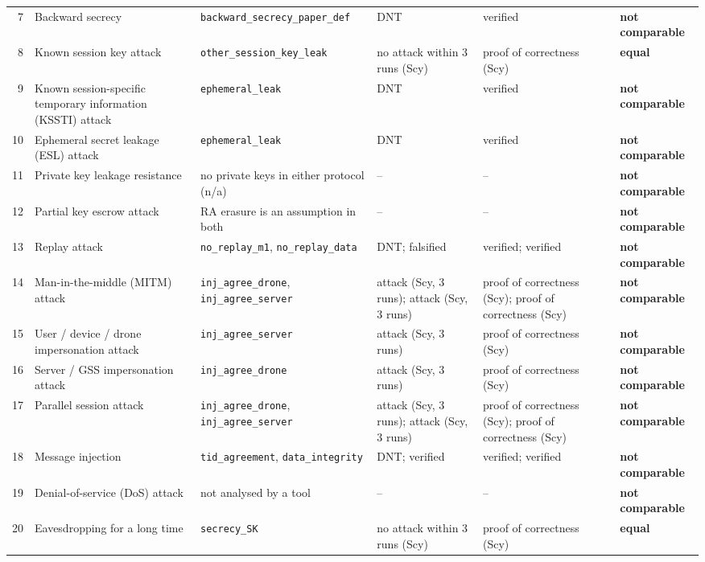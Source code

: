 \begin{table}[!t]
\begin{tabular}{rp{3.0cm}p{4.3cm}p{2.5cm}p{2.0cm}l}
7 & Backward secrecy & \texttt{backward\_\allowbreak{}secrecy\_\allowbreak{}paper\_\allowbreak{}def} & DNT & verified & \textbf{not comparable} \\
8 & Known session key attack & \texttt{other\_\allowbreak{}session\_\allowbreak{}key\_\allowbreak{}leak} & no attack within 3 runs (Scy) & proof of correctness (Scy) & \textbf{equal} \\
9 & Known session-specific temporary information (KSSTI) attack & \texttt{ephemeral\_\allowbreak{}leak} & DNT & verified & \textbf{not comparable} \\
10 & Ephemeral secret leakage (ESL) attack & \texttt{ephemeral\_\allowbreak{}leak} & DNT & verified & \textbf{not comparable} \\
11 & Private key leakage resistance & no private keys in either protocol (n/a) & -- & -- & \textbf{not comparable} \\
12 & Partial key escrow attack & RA erasure is an assumption in both & -- & -- & \textbf{not comparable} \\
13 & Replay attack & \texttt{no\_\allowbreak{}replay\_\allowbreak{}m1}, \texttt{no\_\allowbreak{}replay\_\allowbreak{}data} & DNT; falsified & verified; verified & \textbf{not comparable} \\
14 & Man-in-the-middle (MITM) attack & \texttt{inj\_\allowbreak{}agree\_\allowbreak{}drone}, \texttt{inj\_\allowbreak{}agree\_\allowbreak{}server} & attack (Scy, 3 runs); attack (Scy, 3 runs) & proof of correctness (Scy); proof of correctness (Scy) & \textbf{not comparable} \\
15 & User / device / drone impersonation attack & \texttt{inj\_\allowbreak{}agree\_\allowbreak{}server} & attack (Scy, 3 runs) & proof of correctness (Scy) & \textbf{not comparable} \\
16 & Server / GSS impersonation attack & \texttt{inj\_\allowbreak{}agree\_\allowbreak{}drone} & attack (Scy, 3 runs) & proof of correctness (Scy) & \textbf{not comparable} \\
17 & Parallel session attack & \texttt{inj\_\allowbreak{}agree\_\allowbreak{}drone}, \texttt{inj\_\allowbreak{}agree\_\allowbreak{}server} & attack (Scy, 3 runs); attack (Scy, 3 runs) & proof of correctness (Scy); proof of correctness (Scy) & \textbf{not comparable} \\
18 & Message injection & \texttt{tid\_\allowbreak{}agreement}, \texttt{data\_\allowbreak{}integrity} & DNT; verified & verified; verified & \textbf{not comparable} \\
19 & Denial-of-service (DoS) attack & not analysed by a tool & -- & -- & \textbf{not comparable} \\
20 & Eavesdropping for a long time & \texttt{secrecy\_\allowbreak{}SK} & no attack within 3 runs (Scy) & proof of correctness (Scy) & \textbf{equal} \\
\bottomrule
\end{tabular}
\end{table}

